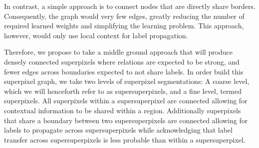 \documentclass{article} %
\begin{document}
In contrast, a simple approach is to connect nodes that are directly share borders. Consequently, the graph would very few edges, greatly reducing the number of required learned weights and simplifying the learning problem. This approach, however, would only use local context for label propagation.

Therefore, we propose to take a middle ground approach that will produce densely connected superpixels where relations are expected to be strong, and fewer edges across boundaries expected to not share labels. In order build this superpixel graph, we take two levels of superpixel segmentations: A coarse level, which we will henceforth refer to as supersuperpixels, and a fine level, termed superpixels. All superpixels within a supersuperpixel are connected allowing for contextual information to be shared within a region. Additionally superpixels that share a boundary between two supersuperpixels are connected allowing for labels to propagate across supersuperpixels while acknowledging that label transfer across supersuperpixels is less probable than within a supersuperpixel.
\end{document}
